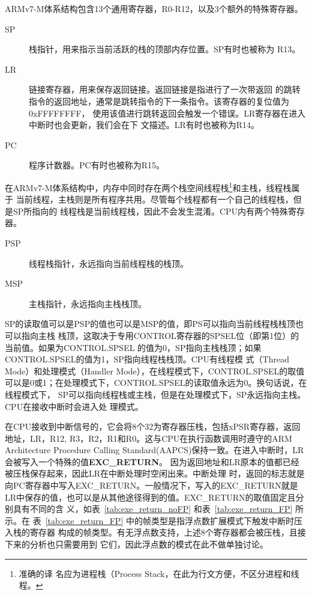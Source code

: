 ARMv7-M体系结构包含13个通用寄存器，R0-R12，以及3个额外的特殊寄存器。

\begin{description}
	\item[SP] 栈指针，用来指示当前活跃的栈的顶部内存位置。SP有时也被称为
	R13。
	\item[LR] 链接寄存器，用来保存返回链接。返回链接是指进行了一次带返回
	的跳转指令的返回地址，通常是跳转指令的下一条指令。该寄存器的复位值为0xFFFFFFFF，
	使用该值进行跳转返回会触发一个错误。LR寄存器在进入中断时也会更新，我们会在下
	文描述。LR有时也被称为R14。
	\item[PC] 程序计数器。PC有时也被称为R15。
\end{description}

在ARMv7-M体系结构中，内存中同时存在两个栈空间\pozhehao 线程栈\footnote{准确的译
名应为进程栈（Process Stack，在此为行文方便，不区分进程和线程。}和主栈，线程栈属于
当前线程，主栈则是所有程序共用。尽管每个线程都有一个自己的线程栈，但是SP所指向的
线程栈是当前线程栈，因此不会发生混淆。CPU内有两个特殊寄存器。

\begin{description}
	\item[PSP] 线程栈指针，永远指向当前线程栈的栈顶。
	\item[MSP] 主栈指针，永远指向主栈栈顶。
\end{description}

SP的读取值可以是PSP的值也可以是MSP的值，即PS可以指向当前线程栈栈顶也可以指向主栈
栈顶，这取决于专用CONTROL寄存器的SPSEL位（即第1位）的当前值。如果为CONTROL.SPSEL
的值为0，SP指向主栈栈顶；如果CONTROL.SPSEL的值为1，SP指向线程栈栈顶。CPU有线程模
式（Thread Mode）和处理模式（Handler Mode），在线程模式下，CONTROL.SPSEL的取值
可以是0或1；在处理模式下，CONTROL.SPSEL的读取值永远为0。换句话说，在线程模式下，
SP可以指向线程栈或主栈，但是在处理模式下，SP永远指向主栈。CPU在接收中断时会进入处
理模式。

在CPU接收到中断信号的，它会将8个32为寄存器压栈，包括xPSR寄存器，返回地址，LR，R12,
R3，R2，R1和R0。这与CPU在执行函数调用时遵守的ARM Architecture Procedure Calling
Standard(AAPCS)保持一致。在进入中断时，LR会被写入一个特殊的值\textbf{EXC\_RETURN}。
因为返回地址和LR原本的值都已经被压栈保存起来，因此LR在中断处理时空闲出来。中断处理
时，返回的标志就是向PC寄存器中写入EXC\_RETURN。一般情况下，写入的EXC\_RETURN就是
LR中保存的值，也可以是从其他途径得到的值。EXC\_RETURN的取值固定且分别具有不同的含
义，如表~\ref{tab:exe_return_noFP} 和表~\ref{tab:exe_return_FP} 所示。在
表~\ref{tab:exe_return_FP} 中的帧类型是指浮点数扩展模式下触发中断时压入栈的寄存器
构成的帧类型。有无浮点数支持，上述8个寄存器都会被压栈，且接下来的分析也只需要用到
它们，因此浮点数的模式在此不做单独讨论。\cite{ARM} 

